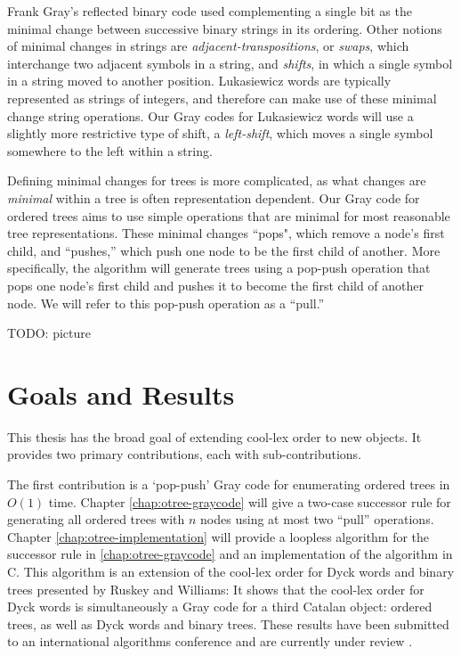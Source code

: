 Frank Gray's reflected binary code used complementing a single bit as the minimal change between successive binary strings in its ordering.  Other notions of minimal changes in strings are \emph{adjacent-transpositions}, or \emph{swaps}, which interchange two adjacent symbols in a string, and \emph{shifts}, in which a single symbol in a string moved to another position. Lukasiewicz words are typically represented as strings of integers, and therefore can make use of these minimal change string operations.  Our Gray codes for Lukasiewicz words will use a slightly more restrictive type of shift, a \emph{left-shift}, which moves a single symbol somewhere to the left within a string. 




Defining minimal changes for trees is more complicated, as what changes are \emph{minimal} within a tree is often representation dependent.  Our Gray code for ordered trees aims to use simple operations that are minimal for most reasonable tree representations.  These minimal changes ``pops", which remove a node's first child, and ``pushes,'' which push one node to be the first child of another.  More specifically, the algorithm will generate trees using a pop-push operation that pops one node's first child and pushes it to become the first child of another node.  We will refer to this pop-push operation as a ``pull.''

TODO: picture



\section{Goals and Results}


This thesis has the broad goal of extending cool-lex order to new objects.  It provides two primary contributions, each with sub-contributions.  

The first contribution is a `pop-push' Gray code for enumerating ordered trees in $O(1)$ time. Chapter \ref{chap:otree-graycode} will give a two-case successor rule for generating all ordered trees with $n$ nodes using at most two ``pull'' operations. Chapter \ref{chap:otree-implementation} will provide a loopless algorithm for the successor rule in \ref{chap:otree-graycode} and an implementation of the algorithm in C.  This algorithm is an extension of the cool-lex order for Dyck words and binary trees presented by Ruskey and Williams: It shows that the cool-lex order for Dyck words is simultaneously a Gray code for a third Catalan object: ordered trees, as well as Dyck words and binary trees.  These results have been submitted to an international algorithms conference and are currently under review \cite{lapeypush}.

